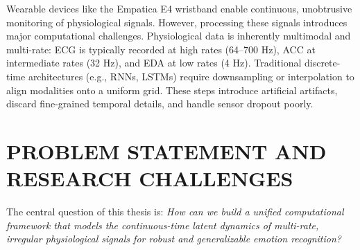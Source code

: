 \documentclass[12pt, a4paper]{report}
\numberwithin{equation}{chapter}
\begin{document}
Wearable devices like the Empatica E4 wristband enable continuous, unobtrusive monitoring of physiological signals. However, processing these signals introduces major computational challenges. Physiological data is inherently multimodal and multi-rate: ECG is typically recorded at high rates (64--700 Hz), ACC at intermediate rates (32 Hz), and EDA at low rates (4 Hz). Traditional discrete-time architectures (e.g., RNNs, LSTMs) require downsampling or interpolation to align modalities onto a uniform grid. These steps introduce artificial artifacts, discard fine-grained temporal details, and handle sensor dropout poorly.


\section{PROBLEM STATEMENT AND RESEARCH CHALLENGES}
The central question of this thesis is: \textit{How can we build a unified computational framework that models the continuous-time latent dynamics of multi-rate, irregular physiological signals for robust and generalizable emotion recognition?}
\end{document}
